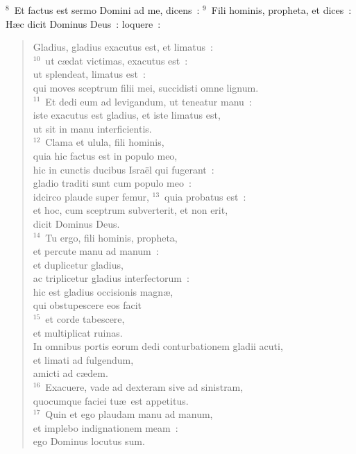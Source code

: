 ${}^{8}$~Et factus est sermo Domini ad me, dicens~:
${}^{9}$~Fili hominis, propheta, et dices~: H\ae c dicit Dominus Deus~: loquere~: \begin{flushleft}\begin{verse}Gladius, gladius exacutus est, et limatus~:\\
${}^{10}$~ut c\ae dat victimas, exacutus est~:\\ ut splendeat, limatus est~:\\ qui moves sceptrum filii mei, succidisti omne lignum.\\
${}^{11}$~Et dedi eum ad levigandum, ut teneatur manu~:\\ iste exacutus est gladius, et iste limatus est,\\ ut sit in manu interficientis.\\
${}^{12}$~Clama et ulula, fili hominis,\\ quia hic factus est in populo meo,\\ hic in cunctis ducibus Isra\"el qui fugerant~:\\ gladio traditi sunt cum populo meo~:\\ idcirco plaude super femur,
${}^{13}$~quia probatus est~:\\ et hoc, cum sceptrum subverterit, et non erit,\\ dicit Dominus Deus.\\
${}^{14}$~Tu ergo, fili hominis, propheta,\\ et percute manu ad manum~:\\ et duplicetur gladius,\\ ac triplicetur gladius interfectorum~:\\ hic est gladius occisionis magn\ae ,\\ qui obstupescere eos facit\\
${}^{15}$~et corde tabescere,\\ et multiplicat ruinas.\\ In omnibus portis eorum dedi conturbationem gladii acuti,\\ et limati ad fulgendum,\\ amicti ad c\ae dem.\\
${}^{16}$~Exacuere, vade ad dexteram sive ad sinistram,\\ quocumque faciei tu\ae\ est appetitus.\\
${}^{17}$~Quin et ego plaudam manu ad manum,\\ et implebo indignationem meam~:\\ ego Dominus locutus sum.\end{verse}\end{flushleft}


